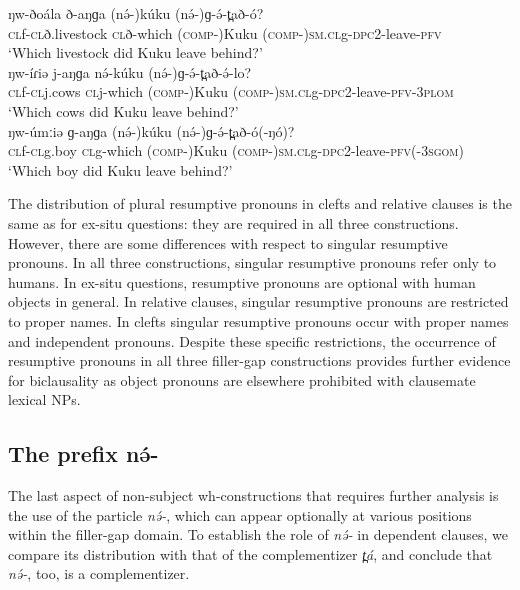 \ea
\ea \gll	ŋw-ðoála	ð-aŋɡa	(nə́-)kúku	(nə́-)ɡ-ə́-t̪að-ó?\\
		\textsc{cl}f-\textsc{cl}ð.livestock	\textsc{cl}ð-which	(\textsc{comp-})Kuku	(\textsc{comp-})\textsc{sm.cl}g-\textsc{dpc}2-leave-\textsc{pfv}\\
\trans		 ‘Which livestock did Kuku leave behind?’\\
\ex \gll	ŋw-íɾiə	j-aŋɡa	nə́-kúku	(nə́-)ɡ-ə́-t̪að-ə́-lo?	\\
		\textsc{cl}f-\textsc{cl}j.cows	\textsc{cl}j-which	(\textsc{comp-})Kuku	(\textsc{comp-})\textsc{sm.cl}g-\textsc{dpc}2-leave-\textsc{pfv}-3\textsc{plom}\\
\trans		‘Which cows did Kuku leave behind?’\\
\ex \gll	ŋw-úmːiə	ɡ-aŋɡa	(nə́-)kúku	(nə́-)ɡ-ə́-t̪að-ó(-ŋó)?\\
		\textsc{cl}f-\textsc{cl}g.boy	\textsc{cl}g-which	(\textsc{comp-})Kuku	(\textsc{comp-})\textsc{sm.cl}g-\textsc{dpc}2-leave-\textsc{pfv}(-3\textsc{sgom})\\
\trans		‘Which boy did Kuku leave behind?’\\
\z
\z

The distribution of plural resumptive pronouns in clefts and relative clauses is the same as for ex-situ questions: they are required in all three constructions. However, there are some differences with respect to singular resumptive pronouns. In all three constructions, singular resumptive pronouns refer only to humans. In ex-situ questions, resumptive pronouns are optional with human objects in general. In relative clauses, singular resumptive pronouns are restricted to proper names. In clefts singular resumptive pronouns occur with proper names and independent pronouns. Despite these specific restrictions, the occurrence of resumptive pronouns in all three filler-gap constructions provides further evidence for biclausality as object pronouns are elsewhere prohibited with clausemate lexical NPs.

\subsection{The prefix nə́-}
The last aspect of non-subject wh-constructions that requires further analysis is the use of the particle \textit{nə́-}, which can appear optionally at various positions within the filler-gap domain. To establish the role of \textit{nə́-} in dependent clauses, we compare its distribution with that of the complementizer \textit{t̪á}, and conclude that \textit{nə́-}, too, is a complementizer.

